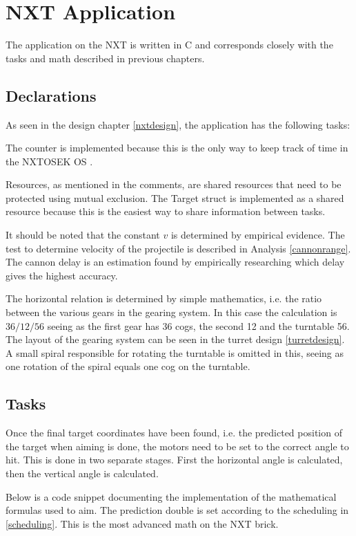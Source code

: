 \section{NXT Application}
The application on the NXT is written in C and corresponds closely with the tasks and math described in previous chapters.

\subsection{Declarations}
As seen in the design chapter \autoref{nxtdesign}, the application has the following tasks:



The counter is implemented because this is the only way to keep track of time in the NXTOSEK OS \cite{osek_spec}.

Resources, as mentioned in the comments, are shared resources that need to be protected using mutual exclusion. The Target struct is implemented as a shared resource because this is the easiest way to share information between tasks.

It should be noted that the constant $v$ is determined by empirical evidence. The test to determine velocity of the projectile is described in Analysis \autoref{cannonrange}. The cannon delay is an estimation found by empirically researching which delay gives the highest accuracy.

The horizontal relation is determined by simple mathematics, i.e. the ratio between the various gears in the gearing system. In this case the calculation is $36/12/56$ seeing as the first gear has 36 cogs, the second 12 and the turntable 56. The layout of the gearing system can be seen in the turret design \autoref{turretdesign}. A small spiral responsible for rotating the turntable is omitted in this, seeing as one rotation of the spiral equals one cog on the turntable.

\subsection{Tasks}
Once the final target coordinates have been found, i.e. the predicted position of the target when aiming is done, the motors need to be set to the correct angle to hit. This is done in two separate stages. First the horizontal angle is calculated, then the vertical angle is calculated.

Below is a code snippet documenting the implementation of the mathematical formulas used to aim. The prediction double is set according to the scheduling in \autoref{scheduling}. This is the most advanced math on the NXT brick.

